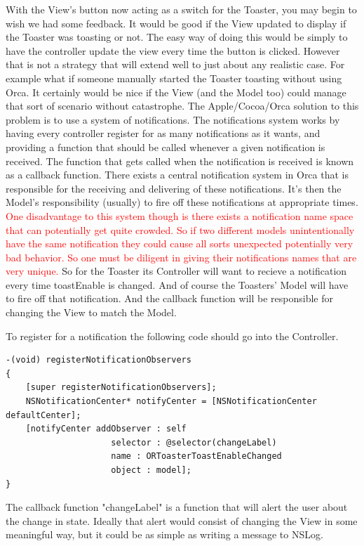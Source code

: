 \documentclass[12pt,a4paper]{article}
\begin{document}
 With the View's button now acting as a switch for the Toaster, you may begin to wish we had some feedback. 
 It would be good if the View updated to display if the Toaster was toasting or not. 
 The easy way of doing this would be simply to have the controller update the view every time the button is clicked.
 However that is not a strategy that will extend well to just about any realistic case.
 For example what if someone manually started the Toaster toasting without using Orca.
 It certainly would be nice if the View (and the Model too) could manage that sort of scenario without catastrophe.
 The Apple/Cocoa/Orca solution to this problem is to use a system of notifications. 
The notifications system works by having every controller register for as many notifications as it wants, and providing a function that should be called whenever a given notification is received. 
The function that gets called when the notification is received is known as a callback function.
There exists a central notification system in Orca that is responsible for the receiving and delivering of these notifications.
It's then the Model's responsibility (usually) to fire off these notifications at appropriate times. 
\textcolor{red}{One disadvantage to this system though is there exists a notification name space that can potentially get quite crowded.
So if two different models unintentionally have the same notification they could cause all sorts unexpected potentially very bad behavior.
So one must be diligent in giving their notifications names that are very unique.}
So for the Toaster its Controller will want to recieve a notification every time toastEnable is changed.
And of course the Toasters' Model will have to fire off that notification.
And the callback function will be responsible for changing the View to match the Model.

To register for a notification the following code should go into the Controller.
\begin{lstlisting}
-(void) registerNotificationObservers
{
    [super registerNotificationObservers];
    NSNotificationCenter* notifyCenter = [NSNotificationCenter defaultCenter];
    [notifyCenter addObserver : self
                     selector : @selector(changeLabel)
                     name : ORToasterToastEnableChanged
                     object : model];
}
\end{lstlisting}

The callback function "changeLabel" is a function that will alert the user about the change in state. 
Ideally that alert would consist of changing the View in some meaningful way, but it could be as simple as writing a message to NSLog.
\end{document}
